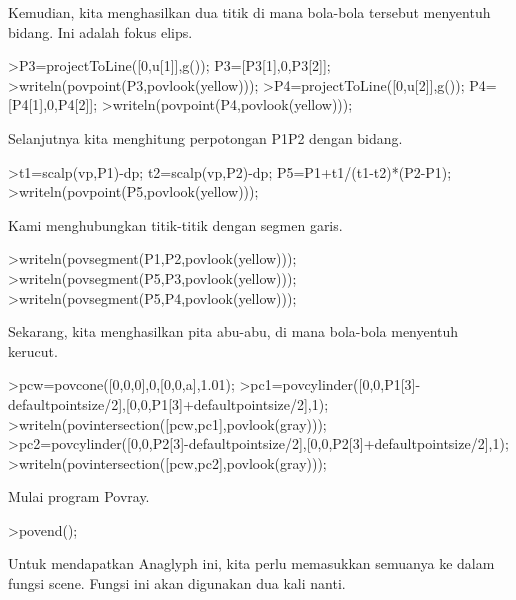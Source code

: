 \documentclass[12pt,Times new roman,letterpaper]{book}
\begin{document}
\begin{eulernootebook}
\begin{eulercomment}
\begin{eulercomment}
\begin{eulernootebook}
\begin{eulercomment}
\begin{eulercomment}
\begin{eulercomment}
\begin{eulercomment}
\begin{eulercomment}
\begin{eulercomment}
\begin{eulernotebook}
\begin{eulercomment}
\begin{eulercomment}
\begin{eulercomment}
\begin{eulercomment}
\begin{eulercomment}
\begin{eulercomment}
Kemudian, kita menghasilkan dua titik di mana bola-bola tersebut
menyentuh bidang. Ini adalah fokus elips.
\end{eulercomment}
\begin{eulerprompt}
>P3=projectToLine([0,u[1]],g()); P3=[P3[1],0,P3[2]];
>writeln(povpoint(P3,povlook(yellow)));
>P4=projectToLine([0,u[2]],g()); P4=[P4[1],0,P4[2]];
>writeln(povpoint(P4,povlook(yellow)));
\end{eulerprompt}
\begin{eulercomment}
Selanjutnya kita menghitung perpotongan P1P2 dengan bidang.
\end{eulercomment}
\begin{eulerprompt}
>t1=scalp(vp,P1)-dp; t2=scalp(vp,P2)-dp; P5=P1+t1/(t1-t2)*(P2-P1);
>writeln(povpoint(P5,povlook(yellow)));
\end{eulerprompt}
\begin{eulercomment}
Kami menghubungkan titik-titik dengan segmen garis.
\end{eulercomment}
\begin{eulerprompt}
>writeln(povsegment(P1,P2,povlook(yellow)));
>writeln(povsegment(P5,P3,povlook(yellow)));
>writeln(povsegment(P5,P4,povlook(yellow)));
\end{eulerprompt}
\begin{eulercomment}
Sekarang, kita menghasilkan pita abu-abu, di mana bola-bola menyentuh
kerucut.
\end{eulercomment}
\begin{eulerprompt}
>pcw=povcone([0,0,0],0,[0,0,a],1.01);
>pc1=povcylinder([0,0,P1[3]-defaultpointsize/2],[0,0,P1[3]+defaultpointsize/2],1);
>writeln(povintersection([pcw,pc1],povlook(gray)));
>pc2=povcylinder([0,0,P2[3]-defaultpointsize/2],[0,0,P2[3]+defaultpointsize/2],1);
>writeln(povintersection([pcw,pc2],povlook(gray)));
\end{eulerprompt}
\begin{eulercomment}
Mulai program Povray.
\end{eulercomment}
\begin{eulerprompt}
>povend();
\end{eulerprompt}
\begin{eulercomment}
Untuk mendapatkan Anaglyph ini, kita perlu memasukkan semuanya ke
dalam fungsi scene. Fungsi ini akan digunakan dua kali nanti.
\end{eulercomment}
\begin{eulerprompt}

\end{eulerprompt}
\end{eulercomment}
\end{eulercomment}
\end{eulercomment}
\end{eulercomment}
\end{eulercomment}
\end{eulernotebook}
\end{eulercomment}
\end{eulercomment}
\end{eulercomment}
\end{eulercomment}
\end{eulercomment}
\end{eulercomment}
\end{eulernootebook}
\end{eulercomment}
\end{eulercomment}
\end{eulernootebook}
\end{document}
